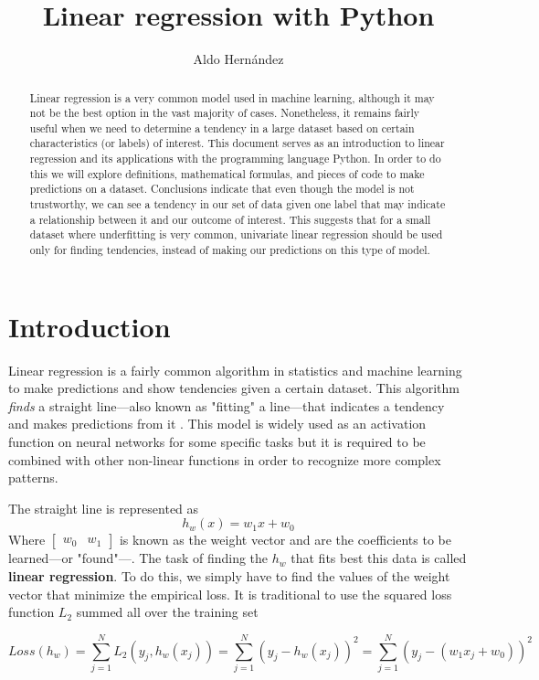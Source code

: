 \documentclass[10pt]{article}
\begin{document}
\begin{opening}
  \title{Linear regression with Python}
  \author[Universidad Autónoma de Nuevo León, San Nicolás de los Garza, aldo.hernandezt@uanl.edu.mx]{Aldo Hernández}

  \begin{abstract}
    Linear regression is a very common model used in machine learning, although it may not be the best option in the vast majority of cases. Nonetheless, it remains fairly useful when we need to determine a tendency in a large dataset based on certain characteristics (or labels) of interest. This document serves as an introduction to linear regression and its applications with the programming language Python. In order to do this we will explore definitions, mathematical formulas, and pieces of code to make predictions on a dataset. Conclusions indicate that even though the model is not trustworthy, we can see a tendency in our set of data given one label that may indicate a relationship between it and our outcome of interest. This suggests that for a small dataset where underfitting is very common, univariate linear regression should be used only for finding tendencies, instead of making our predictions on this type of model.
  \end{abstract}

\end{opening}

\section{Introduction}
Linear regression is a fairly common algorithm in statistics and machine learning to make predictions and show tendencies given a certain dataset. This algorithm \textit{finds} a straight line---also known as "fitting" a line---that indicates a tendency and makes predictions from it \cite{aprendeML}. This model is widely used as an activation function on neural networks for some specific tasks but it is required to be combined with other non-linear functions in order to recognize more complex patterns. \par
The straight line is represented as
\begin{equation*}
    h_{w}(x) = w_{1}x + w_{0}
\end{equation*}
Where $\begin{bmatrix} w_{0} & w_{1} \end{bmatrix}$ is known as the weight vector and are the coefficients to be learned---or "found"---. The task of finding the $h_{w}$ that fits best this data is called \textbf{linear regression}. To do this, we simply have to find the values of the weight vector that minimize the empirical loss. It is traditional to use the squared loss function $L_{2}$ summed all over the training set \cite{ai} \par
\begin{equation*}
    Loss(h_{w}) = \sum_{j=1}^{N}L_{2}(y_{j}, h_{w}(x_{j})) = \sum_{j=1}^{N}(y_{j} - h_{w}(x_{j}))^{2} = \sum_{j=1}^{N}(y_{j} - (w_{1}x_{j} + w_{0}))^{2}
\end{equation*}
\end{document}

